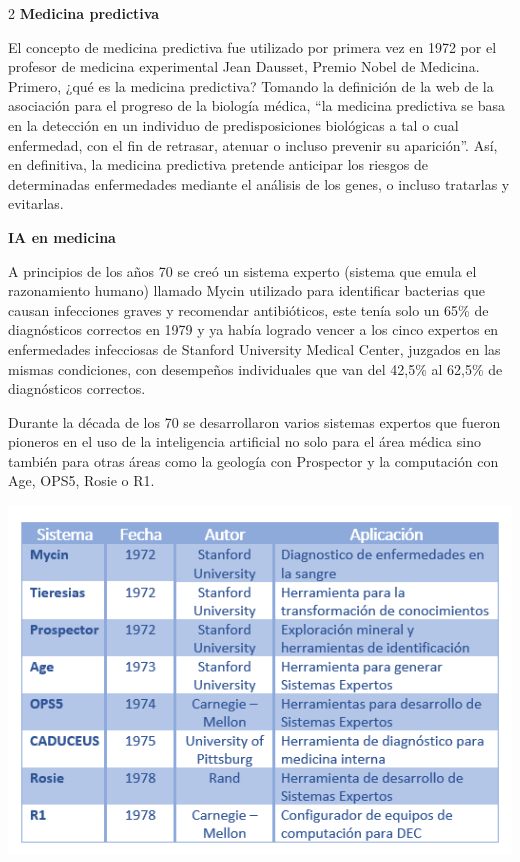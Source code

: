 \documentclass[12pt,spanish,Letterpaper,openany]{book}
\begin{document}
\begin {multicols}{2}
\textbf{Medicina predictiva}

El concepto de medicina predictiva fue utilizado por primera vez en 1972 por el profesor de medicina experimental Jean Dausset, Premio Nobel de Medicina. Primero, ¿qué es la medicina predictiva? Tomando la definición de la web de la asociación para el progreso de la biología médica, ``la medicina predictiva se basa en la detección en un individuo de predisposiciones biológicas a tal o cual enfermedad, con el fin de retrasar, atenuar o incluso prevenir su aparición''. Así, en definitiva, la medicina predictiva pretende anticipar los riesgos de determinadas enfermedades mediante el análisis de los genes, o incluso tratarlas y evitarlas.

\textbf{IA en medicina}

A principios de los años 70 se creó un sistema experto (sistema que emula el razonamiento humano) llamado Mycin utilizado para identificar bacterias que causan infecciones graves y recomendar antibióticos, este tenía solo un 65\% de diagnósticos correctos en 1979 y ya había logrado vencer a los cinco expertos en enfermedades infecciosas de Stanford University Medical Center, juzgados en las mismas condiciones, con desempeños individuales que van del 42,5\% al 62,5\% de diagnósticos correctos.

Durante la década de los 70 se desarrollaron varios sistemas expertos que fueron pioneros en el uso de la inteligencia artificial no solo para el área médica sino también para otras áreas como la geología con Prospector y la computación con Age, OPS5, Rosie o R1.

\begin {flushleft}
\noindent\begin{minipage}[c]{\columnwidth}
\centering

\includegraphics[width=1\linewidth]{images/pareja51_image2}


\end{minipage}
\end{flushleft}
\end{multicols}
\end{document}
